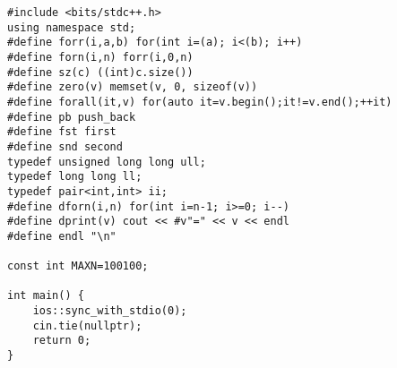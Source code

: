 \begin{verbatim}
#include <bits/stdc++.h>
using namespace std;
#define forr(i,a,b) for(int i=(a); i<(b); i++)
#define forn(i,n) forr(i,0,n)
#define sz(c) ((int)c.size())
#define zero(v) memset(v, 0, sizeof(v))
#define forall(it,v) for(auto it=v.begin();it!=v.end();++it)
#define pb push_back
#define fst first
#define snd second
typedef unsigned long long ull;
typedef long long ll;
typedef pair<int,int> ii;
#define dforn(i,n) for(int i=n-1; i>=0; i--)
#define dprint(v) cout << #v"=" << v << endl
#define endl "\n"

const int MAXN=100100;

int main() {
    ios::sync_with_stdio(0);
    cin.tie(nullptr);
	return 0;
}
\end{verbatim}
